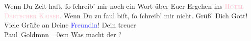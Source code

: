            \pstart
           Wenn Du Zeit haſt, ſo ſchreib’ mir noch ein Wort über Euer Ergehen ins \textsc{\textcolor{pink}{Hotel Deutscher Kaiser}{}\ledrightnote{\textcolor{pink}{Hotel Deutscher Kaiser}}}. Wenn Du zu faul biſt, ſo ſchreib’ mir nicht.\pend
           \pstart
           Grüß’ Dich Gott! Viele Grüße an Deine \textcolor{blue}{Freundin}{}!\pend
           \pstart
           Dein treuer {\\[\baselineskip]}\spacefill\mbox{Paul Goldmnn}\pend
           \leftskip=0em{}\pstart
           \noindent{}Was macht der \label{K_L02810-34v}\label{K_L02810-34h}?\pend
           \endnumbering{}  
      